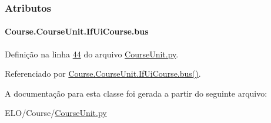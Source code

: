 \subsubsection{Atributos}
\hypertarget{classCourse_1_1CourseUnit_1_1IfUiCourse_a228fc709b99da3a7e6f5020bd07cee03}{
\paragraph[{bus}]{\setlength{\rightskip}{0pt plus 5cm}Course.\-Course\-Unit.\-If\-Ui\-Course.\-bus}}\label{classCourse_1_1CourseUnit_1_1IfUiCourse_a228fc709b99da3a7e6f5020bd07cee03}


Definição na linha \hyperlink{CourseUnit_8py_source_l00044}{44} do arquivo \hyperlink{CourseUnit_8py_source}{Course\-Unit.\-py}.



Referenciado por \hyperlink{classCourse_1_1CourseUnit_1_1IfUiCourse_a6d3c42a9777fe9dd395d9390aef47903}{Course.\-Course\-Unit.\-If\-Ui\-Course.\-bus()}.



A documentação para esta classe foi gerada a partir do seguinte arquivo\-:\begin{DoxyCompactItemize}
\item 
E\-L\-O/\-Course/\hyperlink{CourseUnit_8py}{Course\-Unit.\-py}\end{DoxyCompactItemize}
